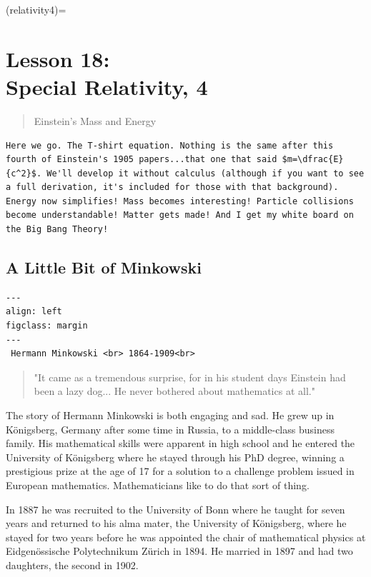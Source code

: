 \documentclass[
]{article}
\date{}
\begin{document}
(relativity4)=

\hypertarget{lesson-18-brspecial-relativity-4}{%
\section{\texorpdfstring{Lesson 18: \\
Special Relativity,
4}{Lesson 18:  Special Relativity, 4}}\label{lesson-18-brspecial-relativity-4}}

\begin{quote}
Einstein's Mass and Energy
\end{quote}

\begin{verbatim}
Here we go. The T-shirt equation. Nothing is the same after this fourth of Einstein's 1905 papers...that one that said $m=\dfrac{E}{c^2}$. We'll develop it without calculus (although if you want to see a full derivation, it's included for those with that background). Energy now simplifies! Mass becomes interesting! Particle collisions become understandable! Matter gets made! And I get my white board on the Big Bang Theory!
\end{verbatim}

\hypertarget{a-little-bit-of-minkowski}{%
\subsection{A Little Bit of Minkowski}\label{a-little-bit-of-minkowski}}

\begin{verbatim}
---
align: left
figclass: margin
---
 Hermann Minkowski <br> 1864-1909<br>
\end{verbatim}

\begin{quote}
"It came as a tremendous surprise, for in his student days Einstein had
been a lazy dog... He never bothered about mathematics at all."
\end{quote}

The story of Hermann Minkowski is both engaging and sad. He grew up in
Königsberg, Germany after some time in Russia, to a middle-class
business family. His mathematical skills were apparent in high school
and he entered the University of Königsberg where he stayed through his
PhD degree, winning a prestigious prize at the age of 17 for a solution
to a challenge problem issued in European mathematics. Mathematicians
like to do that sort of thing.

In 1887 he was recruited to the University of Bonn where he taught for
seven years and returned to his alma mater, the University of
Königsberg, where he stayed for two years before he was appointed the
chair of mathematical physics at Eidgenössische Polytechnikum Zürich in
1894. He married in 1897 and had two daughters, the second in 1902.
\end{document}
